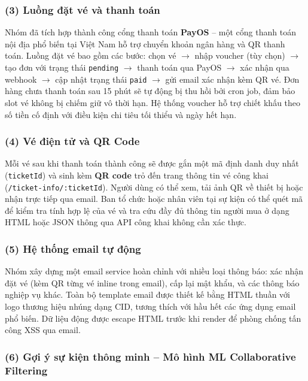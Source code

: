 \subsubsection*{(3) Luồng đặt vé và thanh toán}

\indent \indent Nhóm đã tích hợp thành công cổng thanh toán \textbf{PayOS} -- một cổng thanh
toán nội địa phổ biến tại Việt Nam hỗ trợ chuyển khoản ngân hàng và QR
thanh toán. Luồng đặt vé bao gồm các bước: chọn vé $\to$ nhập voucher
(tùy chọn) $\to$ tạo đơn với trạng thái \texttt{pending} $\to$ thanh toán
qua PayOS $\to$ xác nhận qua webhook $\to$ cập nhật trạng thái
\texttt{paid} $\to$ gửi email xác nhận kèm QR vé. Đơn hàng chưa thanh
toán sau 15 phút sẽ tự động bị thu hồi bởi cron job, đảm bảo slot vé
không bị chiếm giữ vô thời hạn. Hệ thống voucher hỗ trợ chiết khấu
theo số tiền cố định với điều kiện chi tiêu tối thiểu và ngày hết hạn.

\subsubsection*{(4) Vé điện tử và QR Code}

\indent \indent Mỗi vé sau khi thanh toán thành công sẽ được gắn một mã định danh duy nhất
(\texttt{ticketId}) và sinh kèm \textbf{QR code} trỏ đến trang thông tin
vé công khai (\texttt{/ticket-info/:ticketId}). Người dùng có thể xem, tải
ảnh QR về thiết bị hoặc nhận trực tiếp qua email. Ban tổ chức hoặc nhân
viên tại sự kiện có thể quét mã để kiểm tra tính hợp lệ của vé và tra cứu
đầy đủ thông tin người mua ở dạng HTML hoặc JSON thông qua API công khai
không cần xác thực.

\subsubsection*{(5) Hệ thống email tự động}

\indent \indent Nhóm xây dựng một email service hoàn chỉnh với nhiều loại thông báo: xác
nhận đặt vé (kèm QR từng vé inline trong email), cấp lại mật khẩu, và các
thông báo nghiệp vụ khác. Toàn bộ template email được thiết kế bằng HTML
thuần với logo thương hiệu nhúng dạng CID, tương thích với hầu hết các
ứng dụng email phổ biến. Dữ liệu động được escape HTML trước khi render
để phòng chống tấn công XSS qua email.

\subsubsection*{(6) Gợi ý sự kiện thông minh -- Mô hình ML Collaborative Filtering}

